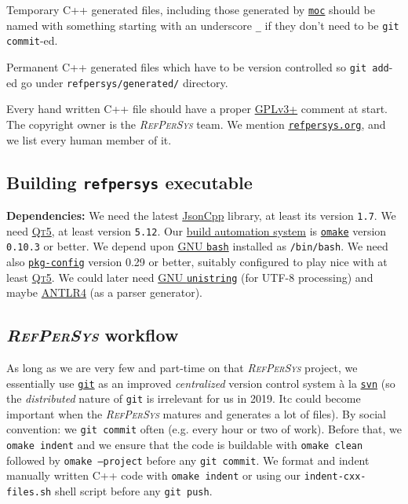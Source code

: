 \documentclass[11pt,a4paper,svgnames]{article}
\newcommand{\RefPerSys}{{\textit{\textsc{RefPerSys}}}}
\begin{document}
Temporary C++ generated files, including those generated by
\href{https://doc.qt.io/qt-5/moc.html}{\texttt{moc}} should be named
with something starting with an underscore \texttt{\_} if they don't
need to be \texttt{git commit}-ed.

Permanent C++ generated files which have to be version controlled so
\texttt{git add}-ed go under \texttt{refpersys/generated/} directory.

Every hand written C++ file should have a proper
\href{https://www.gnu.org/licenses/gpl-3.0.en.html}{GPLv3+} comment at
start.  The copyright owner is the {\RefPerSys} team. We mention
\href{http://refpersys.org/}{\texttt{refpersys.org}}, and we list
every human member of it.

\subsection{Building \texttt{refpersys} executable}
\label{subsec:building}

\textbf{Dependencies:} We need the latest
\href{https://github.com/open-source-parsers/jsoncpp}{JsonCpp} library, at least
its version \texttt{1.7}.  We need \href{http://qt.io}{\textsc{Qt5}},
  at least version \texttt{5.12}. Our
  \href{https://en.wikipedia.org/wiki/Build_automation}{build
    automation system} is
  \href{http://projects.camlcity.org/projects/omake.html}{\texttt{omake}}
  version \texttt{0.10.3} or better.  We depend upon
  \href{https://www.gnu.org/software/bash/}{GNU \texttt{bash}}
  installed as \texttt{/bin/bash}.  We need also
  \href{https://www.freedesktop.org/wiki/Software/pkg-config/}{\texttt{pkg-config}}
  version 0.29 or better, suitably configured to play nice with at
  least \href{http://qt.io}{\textsc{Qt5}}.  We could later need
    \href{https://www.gnu.org/software/libunistring/}{GNU
      \texttt{unistring}} (for UTF-8 processing) and maybe
    \href{https://www.antlr.org/}{ANTLR4} (as a parser generator).

\subsection{{\RefPerSys} workflow}
\label{subsec:workflow}

As long as we are very few and part-time on that {\RefPerSys} project,
we essentially use \href{https://git-scm.com/}{\texttt{git}} as an
improved \textit{centralized} version control system à la
\href{https://subversion.apache.org/}{\texttt{svn}} (so the
\textit{distributed} nature of \texttt{git} is irrelevant for us in
2019. Itc could become important when the {\RefPerSys} matures and
generates a lot of files).  By social convention: we \texttt{git
  commit} often (e.g. every hour or two of work). Before that, we
\texttt{omake indent} and we ensure that the code is buildable with
\texttt{omake clean} followed by \texttt{omake --project} before any
\texttt{git commit}. We format and indent manually written C++ code
with \texttt{omake indent} or using our \texttt{indent-cxx-files.sh}
shell script before any \texttt{git push}.
\end{document}
